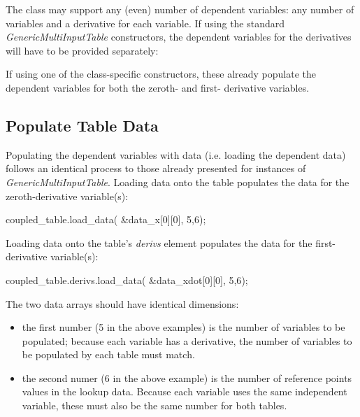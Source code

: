 \documentclass[11pt,fleqn]{report}
\begin{document}
The class may support any (even) number of dependent variables:
any number of variables and a derivative for each variable.
If using the standard \textit{GenericMultiInputTable} constructors, the
dependent variables for the derivatives will have to be provided separately:
\begin{code}
for (int ii = 0; ii < 5; ++ii) {
   coupled_table.derivs.add_dependent(xdot[ii]);
\end{code}
If using one of the class-specific constructors, these already populate the
dependent variables for both the zeroth- and first- derivative variables.


\subsection{Populate Table Data}
Populating the dependent variables with data (i.e. loading the dependent
data) follows an identical process to those already
presented for instances of \textit{GenericMultiInputTable}. Loading data onto
the table populates the data for the zeroth-derivative variable(s):
\begin{code}
coupled_table.load_data( &data_x[0][0], {5,6});
\end{code}

Loading data onto the table's \textit{derivs} element populates the data
for the first-derivative variable(s):
\begin{code}
coupled_table.derivs.load_data( &data_xdot[0][0], {5,6});
\end{code}

The two data arrays should have identical dimensions:
\begin{itemize}
\item the first number (5 in the above examples) is the number of variables
      to be populated; because each variable has a derivative, the number of
      variables to be populated by each table must match.
\item the second numer (6 in the above example) is the number of reference
      points values in the lookup data. Because each variable uses the same
      independent variable, these must also be the same number for both tables.
\end{itemize}
\end{document}
